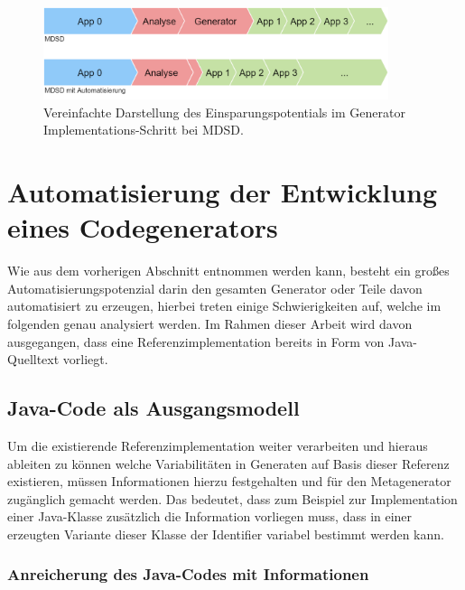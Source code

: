 \documentclass[12pt,oneside,a4paper,parskip]{scrbook}
\begin{document}
\begin{figure}[htbp]
	\centering
	\includegraphics[width=0.9\textwidth]{bilder/vergleich_2}
	\caption{Vereinfachte Darstellung des Einsparungspotentials im Generator Implementations-Schritt bei MDSD.}
	\label{fig:vgl2}
\end{figure}


\section{Automatisierung der Entwicklung eines Codegenerators}

Wie aus dem vorherigen Abschnitt entnommen werden kann, besteht ein großes Automatisierungspotenzial darin den gesamten Generator oder Teile davon automatisiert zu erzeugen, hierbei treten einige Schwierigkeiten auf, welche im folgenden genau analysiert werden. Im Rahmen dieser Arbeit wird davon ausgegangen, dass eine Referenzimplementation bereits in Form von Java-Quelltext vorliegt.

\subsection{Java-Code als Ausgangsmodell}

Um die existierende Referenzimplementation weiter verarbeiten und hieraus ableiten zu können welche Variabilitäten in Generaten auf Basis dieser Referenz existieren, müssen Informationen hierzu festgehalten und für den Metagenerator zugänglich gemacht werden. Das bedeutet, dass zum Beispiel zur Implementation einer Java-Klasse zusätzlich die Information vorliegen muss, dass in einer erzeugten Variante dieser Klasse der Identifier variabel bestimmt werden kann.

\subsubsection{Anreicherung des Java-Codes mit Informationen}
\end{document}
